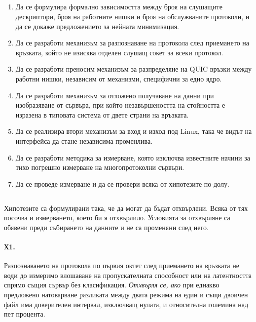 \subsection*{}

\begin{enumerate}[leftmargin=*, nosep]
  \item Да се формулира формално зависимостта между броя на слушащите дескриптори, броя на
        работните нишки и броя на обслужваните протоколи, и да се докаже предложението за
        нейната минимизация.
  \item Да се разработи механизъм за разпознаване на протокола след приемането на връзката,
        който не изисква отделен слушащ сокет за всеки протокол.
  \item Да се разработи преносим механизъм за разпределяне на QUIC връзки между работни
        нишки, независим от механизми, специфични за едно ядро.
  \item Да се разработи механизъм за отложено получаване на данни при изобразяване от
        сървъра, при който незавършеността на стойността е изразена в типовата система от
        двете страни на връзката.
  \item Да се реализира втори механизъм за вход и изход под Linux, така че видът на
        интерфейса да стане независима променлива.
  \item Да се разработи методика за измерване, която изключва известните начини за тихо
        погрешно измерване на многопротоколни сървъри.
  \item Да се проведе измерване и да се провери всяка от хипотезите по-долу.
\end{enumerate}

\subsection*{}

Хипотезите са формулирани така, че да могат да бъдат отхвърлени. Всяка от тях посочва и
измерването, което би я отхвърлило. Условията за отхвърляне са обявени преди събирането на
данните и не са променяни след него.

\paragraph{Х1.} Разпознаването на протокола по първия октет след приемането на връзката не
води до измеримо влошаване на пропускателната способност или на латентността спрямо същия
сървър без класификация.
\emph{Отхвърля се, ако} при еднакво предложено натоварване разликата между двата режима на
един и същи двоичен файл има доверителен интервал, изключващ нулата, и относителна големина
над пет процента.

